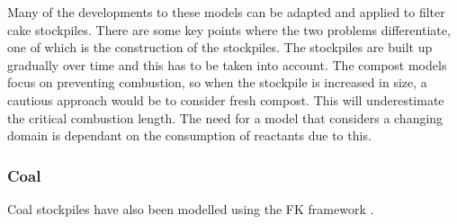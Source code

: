 Many of the developments to these models can be adapted and applied to filter cake stockpiles. There are some key points where the two problems differentiate, one of which is the construction of the stockpiles. The stockpiles are built up gradually over time and this has to be taken into account. The compost models focus on preventing combustion, so when the stockpile is increased in size, a cautious approach would be to consider fresh compost. This will underestimate the critical combustion length. The need for a model that considers a changing domain is dependant on the consumption of reactants due to this.

\subsubsection{Coal}
Coal stockpiles have also been modelled using the FK framework \cite{Zhang16}. 
